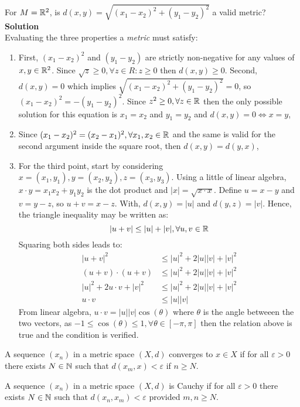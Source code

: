 \begin{eg}
    For $M = \mathbb{R}^2$, is $d(x, y) = \sqrt{(x_1 -  x_2)^2 + (y_1 - y_2)^2}$ a valid metric? \\
    \textbf{Solution} \\
    Evaluating the three properties a \emph{metric} must satisfy:
    \begin{enumerate}
        \item First, $(x_1 - x_2)^2$ and $(y_1 - y_2)$ are strictly non-negative for any values of $x,y \in \mathbb{R}^2$. Since $\sqrt{z} \geq 0, \forall z \in R : z \geq 0$ then $d(x, y) \geq 0$. Second, $d(x, y) = 0$ which implies $\sqrt{(x_1 - x_2)^2 + (y_1- y_2)^2} = 0$, so $(x_1 - x_2)^2 = - (y_1 - y_2)^2$. Since $z^2 \geq 0, \forall z \in \mathbb{R}$ then the only possible solution for this equation is $x_1 = x_2$ and $y_1 = y_2$ and $d(x, y) = 0 \Longleftrightarrow x = y$,
        \item Since $(x_1 - x_2)^2 = (x_2 - x_1)^2, \forall x_1, x_2 \in \mathbb{R}$ and the same is valid for the second argument inside the square root, then $d(x, y) = d(y, x)$,
        \item For the third point, start by considering $x = (x_1, y_1), y = (x_2, y_2), z = (x_3, y_3)$. Using a little of linear algebra, $x \cdot y = x_1x_2 + y_1y_2$ is the dot product and $|x| = \sqrt{x \cdot x}$. Define $u = x - y$ and $v = y - z$, so $u + v = x - z$. With, $d(x,y) = |u|$ and $d(y,z) = |v|$. Hence, the triangle inequality may be written as:
        \begin{equation*}
            |u + v| \leq |u| + |v|, \forall u, v \in \mathbb{R}
        \end{equation*}
        Squaring both sides leads to:
        \begin{align*}
            |u + v|^2 &\leq |u|^2 + 2|u||v| + |v|^2 \\
            (u + v) \cdot (u + v) &\leq |u|^2 + 2|u||v| + |v|^2 \\
            |u|^2 + 2u\cdot v + |v|^2 &\leq |u|^2 + 2|u||v| + |v|^2 \\
            u\cdot v &\leq |u||v|
        \end{align*}
        From linear algebra, $u \cdot v = |u||v|\cos(\theta)$ where $\theta$ is the angle betweeen the two vectors, as $-1 \leq \cos(\theta) \leq 1 ,\forall \theta \in [-\pi, \pi]$ then the relation above is true and the condition is verified.
    \end{enumerate}
\end{eg}

\begin{definition}[Convergence]
    A sequence $(x_n) $ in a metric space $(X, d)$ converges to $x \in X$ if for all $\varepsilon > 0$ there exists $N \in \mathbb{N}$ such that $d(x_m, x) < \varepsilon$ if $n \geq N$.
\end{definition}

\begin{definition}
    A sequence $(x_n)$ in a metric space $(X, d)$ is Cauchy if for all $\varepsilon > 0$ there exists $N \in \mathbb{N}$ such that $d(x_n, x_m) < \varepsilon$ provided $m, n \geq N$.
\end{definition}
